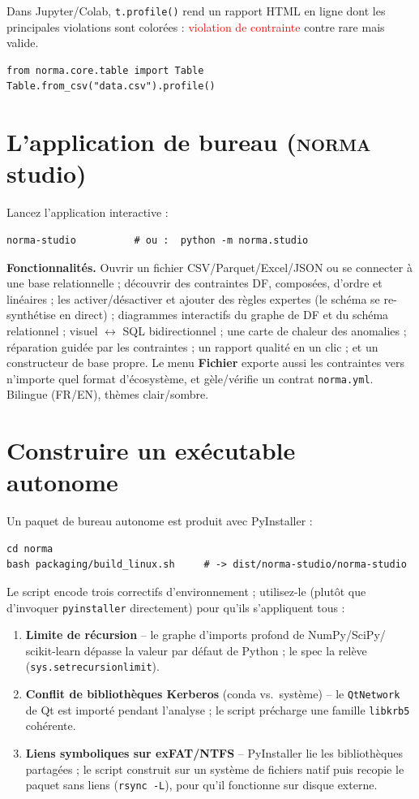 \documentclass[11pt,a4paper]{article}
\newcommand{\norma}{\textsc{norma}}
\newcommand{\code}[1]{\texttt{#1}}
\begin{document}
\noindent Dans Jupyter/Colab, \code{t.profile()} rend un rapport HTML en ligne dont les
principales violations sont colorées : \textcolor{red}{violation de contrainte} contre
\textcolor{orange!80!black}{rare mais valide}.
\begin{lstlisting}[style=py]
from norma.core.table import Table
Table.from_csv("data.csv").profile()
\end{lstlisting}

\section{L'application de bureau (\norma{} studio)}
Lancez l'application interactive :
\begin{lstlisting}
norma-studio          # ou :  python -m norma.studio
\end{lstlisting}
\textbf{Fonctionnalités.} Ouvrir un fichier CSV/Parquet/Excel/JSON ou se connecter à une
base relationnelle ; découvrir des contraintes DF, composées, d'ordre et linéaires ;
les activer/désactiver et ajouter des règles expertes (le schéma se re-synthétise en
direct) ; diagrammes interactifs du graphe de DF et du schéma relationnel ; visuel
$\leftrightarrow$ SQL bidirectionnel ; une carte de chaleur des anomalies ; réparation
guidée par les contraintes ; un rapport qualité en un clic ; et un constructeur de base
propre. Le menu \textbf{Fichier} exporte aussi les contraintes vers n'importe quel format
d'écosystème, et gèle/vérifie un contrat \code{norma.yml}. Bilingue (FR/EN), thèmes
clair/sombre.

\section{Construire un exécutable autonome}
Un paquet de bureau autonome est produit avec PyInstaller :
\begin{lstlisting}
cd norma
bash packaging/build_linux.sh     # -> dist/norma-studio/norma-studio
\end{lstlisting}
Le script encode trois correctifs d'environnement ; utilisez-le (plutôt que d'invoquer
\code{pyinstaller} directement) pour qu'ils s'appliquent tous :
\begin{enumerate}[nosep,leftmargin=1.6em]
  \item \textbf{Limite de récursion} -- le graphe d'imports profond de NumPy/SciPy/
        scikit-learn dépasse la valeur par défaut de Python ; le spec la relève
        (\code{sys.setrecursionlimit}).
  \item \textbf{Conflit de bibliothèques Kerberos} (conda vs.\ système) -- le \code{QtNetwork}
        de Qt est importé pendant l'analyse ; le script précharge une famille
        \code{libkrb5} cohérente.
  \item \textbf{Liens symboliques sur exFAT/NTFS} -- PyInstaller lie les bibliothèques
        partagées ; le script construit sur un système de fichiers natif puis recopie le
        paquet sans liens (\code{rsync -L}), pour qu'il fonctionne sur disque externe.
\end{enumerate}
\end{document}

